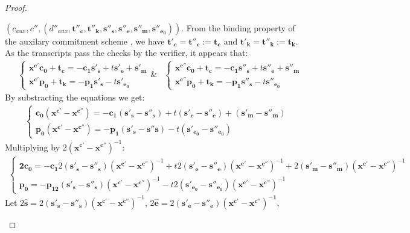 \begin{proof}
\begin{description}
    $(c_{aux}, c'', (d''_{aux}, \mathbf{t''_c, t''_k, s''_s, s''_e,
      s''_m, s''_{e_0}}))$. From the binding property of the auxilary
    commitment scheme \cite{pedersen1991non}, we have $\mathbf{t'_c = t''_c := t_c}$
    and $\mathbf{t'_k = t''_k := t_k}$. As the transcripts pass the
    checks by the verifier, it appears that:
    \begin{align*}
      &\begin{cases}
        \mathbf{x^{c'}c_0 + t_c} = -\mathbf{c_1s'_{s}} +
        t\mathbf{s'_{e}+ s'_{m}}
        \\
        \mathbf{x^{c'}p_0} + \mathbf{t_k} = -\mathbf{p_1s'_s}
        -t\mathbf{s'_{e_0}}
      \end{cases} \&
      &\begin{cases}
        \mathbf{x^{c''}c_0 + t_c} = -\mathbf{c_1s''_{s}} +
        t\mathbf{s''_{e}+ s''_{m}}
        \\
        \mathbf{x^{c''}p_0} + \mathbf{t_k} = -\mathbf{p_1s''_s}
        -t\mathbf{s''_{e_0}}
      \end{cases}
    \end{align*}
    By substracting the equations we get:
    \begin{align*}
      \begin{cases}
        \mathbf{c_0(x^{c'} - x^{c''})} = -\mathbf{c_1}(\mathbf{s'_s
          - s''_s}) + t\mathbf{(s'_e - s''_e)} +(\mathbf{s'_m -
          s''_m})\\
        \mathbf{p_0(x^{c'} - x^{c''})} = -\mathbf{p_1(s'_s - s''s)}
        - t\mathbf{(s'_{e_0} - s''_{e_0})}
      \end{cases}
    \end{align*}
    Multiplying by $2(\mathbf{x^{c'} - x^{c''}})^{-1}$:
    \begin{align*}
      \begin{cases}
        \mathbf{2c_0} = -\mathbf{c_1}2(\mathbf{s'_s
          - s''_s})(\mathbf{x^{c'} - x^{c''}})^{-1} + t2\mathbf{(s'_e -
          s''_e)}(\mathbf{x^{c'} - x^{c''}})^{-1} +2(\mathbf{s'_m -
          s''_m})(\mathbf{x^{c'} - x^{c''}})^{-1}\\
        \mathbf{p_0} = -\mathbf{p_12(s'_s - s''_s)}(\mathbf{x^{c'} - x^{c''}})^{-1}
        - t2\mathbf{(s'_{e_0} - s''_{e_0})}(\mathbf{x^{c'} - x^{c''}})^{-1}
      \end{cases}
    \end{align*}
    Let $2\hat{\mathbf{s}} = 2(\mathbf{s'_s -
      s''_s})(\mathbf{x^{c'}-x^{c''}})^{-1} $, $2\hat{\mathbf{e}} =
    2\mathbf{(s'_e - s''_e)(x^{c'} - x^{c''})^{-1}}$,

\end{description}
\end{proof}
